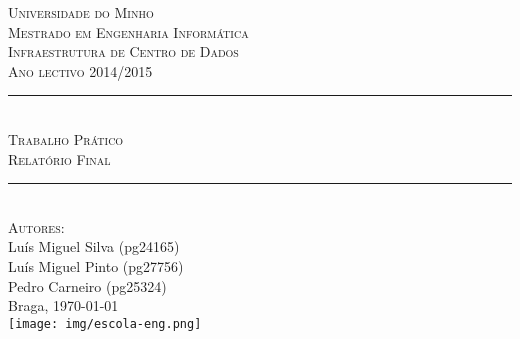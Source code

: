 \begin{titlepage}
\onehalfspacing
\newcommand{\HRule}{\rule{\linewidth}{0.5mm}} %
\center %
\textsc{\LARGE Universidade do Minho}\\[1.5cm] %
\textsc{\Large Mestrado em Engenharia Informática}\\[0.5cm] %
\textsc{\large Infraestrutura de Centro de Dados}\\[0.5cm] %
\textsc{Ano lectivo 2014/2015}\\[0.5cm]
\HRule \\[0.4cm]
\textsc{\Large Trabalho Prático}\\[0.4cm] %
\textsc{ \large Relatório Final}\\[0.4cm] %
\HRule \\[1.5cm]
\textsc{\large Autores:}\\
{
Luís Miguel Silva (pg24165) \\
Luís Miguel Pinto (pg27756) \\
Pedro Carneiro (pg25324)
}\\[1cm] %
Braga, {\large \today}\\[1cm] %
\texttt{[image: img/escola-eng.png]}\\[0cm] %
\vfill %
\end{titlepage}
